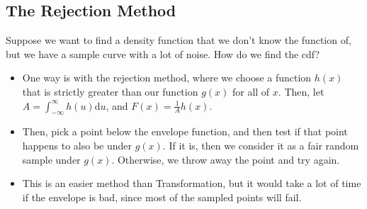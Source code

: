 \documentclass[10pt]{article}
\newcommand{\dd}{\text{d}}
\begin{document}
\subsection*{The Rejection Method}
Suppose we want to find a density function that we don't know the function of, but we have a sample curve with a lot of noise.  How do we find the cdf?
\begin{itemize}
	\item One way is with the rejection method, where we choose a function $h(x)$ that is strictly greater than our function $g(x)$ for all of $x$.  Then, let $A = \int_{-\infty}^\infty h(u) \dd u$, and $F(x) = \frac{1}{A} h(x)$.
	\item Then, pick a point below the envelope function, and then test if that point happens to also be under $g(x)$.  If it is, then we consider it as a fair random sample under $g(x)$.  Otherwise, we throw away the point and try again.
	\item This is an easier method than Transformation, but it would take a lot of time if the envelope is bad, since most of the sampled points will fail.
\end{itemize}
\end{document}
